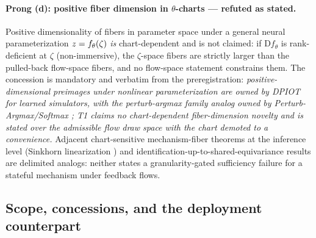 \paragraph{Prong (d): positive fiber dimension in $\theta$-charts ---
refuted as stated.}
Positive dimensionality of fibers in parameter space under a general neural
parameterization $z = f_{\theta}(\zeta)$ \emph{is} chart-dependent
and is not claimed: if $\mathrm{D}f_{\theta}$ is rank-deficient at $\zeta$
(non-immersive), the $\zeta$-space fibers are strictly larger than the
pulled-back flow-space fibers, and no flow-space statement constrains them.
The concession is mandatory and verbatim from the preregistration:
\emph{positive-dimensional preimages under nonlinear parameterization are
owned by DPIOT \citep{dpiot2022} for learned simulators, with the
perturb-argmax family analog owned by Perturb-Argmax/Softmax
\citep{perturbargmax2024}; T1 claims no chart-dependent fiber-dimension
novelty and is stated over the admissible flow draw space with the chart
demoted to a convenience.} Adjacent chart-sensitive mechanism-fiber theorems
at the inference level (Sinkhorn linearization \citep{sinkhornlinearization2026})
and identification-up-to-shared-equivariance results
\citep{propertiesmechanisms2022} are delimited analogs: neither states a
granularity-gated sufficiency failure for a stateful mechanism under
feedback flows.


\subsection{Scope, concessions, and the deployment counterpart}
\label{sec:t1-scope}

